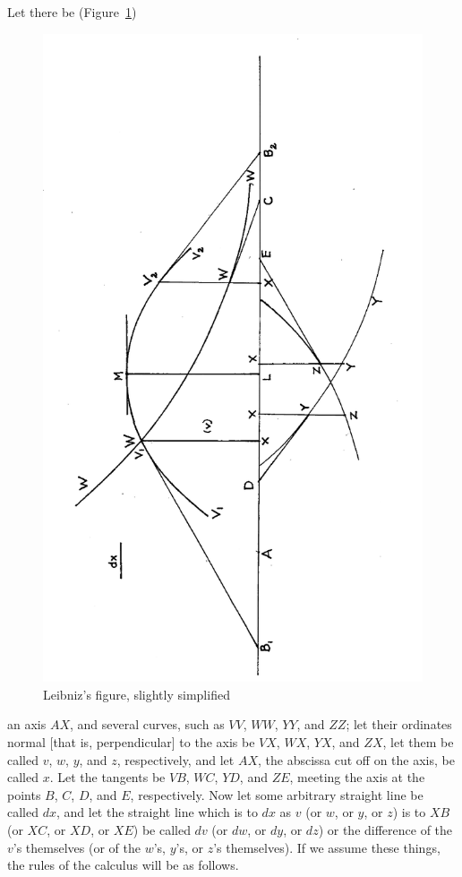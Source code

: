 \documentclass[twoside,openright]{article}
\begin{document}
Let there be (Figure~\ref{newmeth1})
\begin{figure}[htp]
  \begin{center}
 \includegraphics[width=.85\textwidth]{fig/Figure2}
    \caption{Leibniz's figure, slightly simplified}
    \label{newmeth1}
  \end{center}
\end{figure}
an axis $AX$, and several curves, such as $VV$, $WW$, $YY$, and $ZZ$;
let their ordinates normal [that is, perpendicular] to the axis be
$VX$, $WX$, $YX$, and $ZX$, let them be called $v$, $w$, $y$, and $z$,
respectively, and let $AX$, the abscissa cut off on the axis, be
called $x$. Let the tangents be
$VB$, $WC$, $YD$, and $ZE$, meeting the axis at the points $B$, $C$,
$D$, and $E$, respectively.  Now let some arbitrary straight line be
called $dx$, and let the straight line which is to $dx$ as $v$ (or
$w$, or $y$, or $z$) is to $XB$ (or $XC$, or $XD$, or $XE$) be called
$dv$ (or $dw$, or $dy$, or $dz$) or the difference of the $v$'s
themselves (or of the $w$'s, $y$'s, or $z$'s
themselves).\label{diffdef} If
we assume these things, the rules of the calculus will be as follows.
\end{document}

